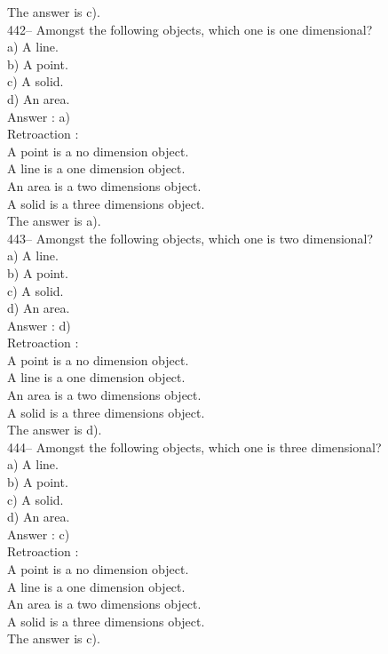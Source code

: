 ﻿\documentclass[letterpaper, 12pt]{article}
\begin{document}
The answer is c).\\


442-- Amongst the following objects, which one is one dimensional?\\
a) A line.\\
b) A point.\\
c) A solid.\\
d) An area.\\


Answer : a)\\

Retroaction : \\

A point is a no dimension object.\\
A line is a one dimension object.\\
An area is a two dimensions object.\\
A solid is a three dimensions object.\\
The answer is a).\\

443-- Amongst the following objects, which one is two dimensional?\\
a) A line.\\
b) A point.\\
c) A solid.\\
d) An area.\\

Answer : d)\\

Retroaction : \\
A point is a no dimension object.\\
A line is a one dimension object.\\
An area is a two dimensions object.\\
A solid is a three dimensions object.\\
The answer is d).\\

444-- Amongst the following objects, which one is three dimensional?\\
a) A line.\\
b) A point.\\
c) A solid.\\
d) An area.\\

Answer : c)\\

Retroaction : \\
A point is a no dimension object.\\
A line is a one dimension object.\\
An area is a two dimensions object.\\
A solid is a three dimensions object.\\
The answer is c).\\
\end{document}
